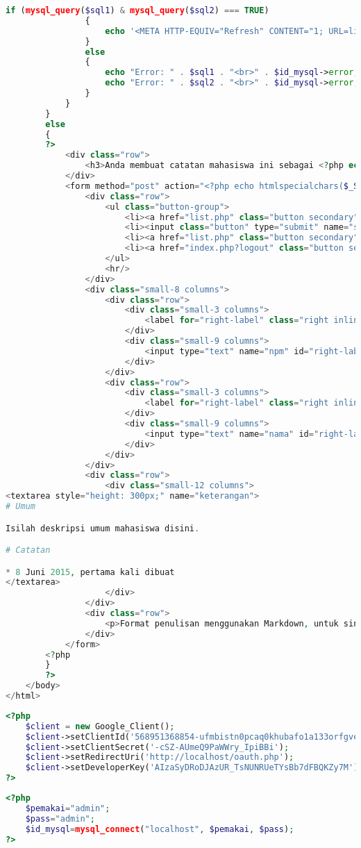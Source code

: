 \begin{lstlisting}[language=php,basicstyle=\tiny,caption=new.php]
				if (mysql_query($sql1) & mysql_query($sql2) === TRUE) 
				{
					echo '<META HTTP-EQUIV="Refresh" CONTENT="1; URL=list.php">';
				}
				else
				{
					echo "Error: " . $sql1 . "<br>" . $id_mysql->error;
					echo "Error: " . $sql2 . "<br>" . $id_mysql->error;
				}
			}
		}
		else
		{
		?>
			<div class="row">
				<h3>Anda membuat catatan mahasiswa ini sebagai <?php echo $_SESSION['email']?>.</h3>
			</div>
			<form method="post" action="<?php echo htmlspecialchars($_SERVER["PHP_SELF"]);?>">
				<div class="row">
					<ul class="button-group">
						<li><a href="list.php" class="button secondary">Kembali</a></li>
						<li><input class="button" type="submit" name="submit" value="Simpan"></li>
						<li><a href="list.php" class="button secondary">Menu Utama</a></li>
						<li><a href="index.php?logout" class="button secondary">Logout</a></li>
					</ul>
					<hr/>
				</div>
				<div class="small-8 columns">
					<div class="row">
						<div class="small-3 columns">
							<label for="right-label" class="right inline">NPM</label>
						</div>
						<div class="small-9 columns">
							<input type="text" name="npm" id="right-label" placeholder="Masukan NPM">
						</div>
					</div>
					<div class="row">
						<div class="small-3 columns">
							<label for="right-label" class="right inline">Nama</label>
						</div>
						<div class="small-9 columns">
							<input type="text" name="nama" id="right-label" placeholder="Masukan nama">
						</div>
					</div>
				</div>
				<div class="row">
					<div class="small-12 columns">
<textarea style="height: 300px;" name="keterangan">
# Umum

Isilah deskripsi umum mahasiswa disini.

# Catatan

* 8 Juni 2015, pertama kali dibuat
</textarea>
					</div>
				</div>
				<div class="row">
					<p>Format penulisan menggunakan Markdown, untuk sintaks Markdown dapat dilihat <a href='https://help.github.com/articles/github-flavored-markdown/' target="_blank">disini</a>.</p>
				</div>
			</form>
		<?php
		}
		?>
	</body>
</html>
\end{lstlisting}

\begin{lstlisting}[language=php,basicstyle=\tiny,caption=client.php]
<?php
	$client = new Google_Client();
	$client->setClientId('568951368854-ufmbistn0pcaq0khubafo1a133orfgve.apps.googleusercontent.com');
	$client->setClientSecret('-cSZ-AUmeQ9PaWWry_IpiBBi');
	$client->setRedirectUri('http://localhost/oauth.php'); 
	$client->setDeveloperKey('AIzaSyDRoDJAzUR_TsNUNRUeTYsBb7dFBQKZy7M');
?>
\end{lstlisting}

\begin{lstlisting}[language=php,basicstyle=\tiny,caption=configDatabase.php]
<?php
	$pemakai="admin";
	$pass="admin";
	$id_mysql=mysql_connect("localhost", $pemakai, $pass);
?>
\end{lstlisting}